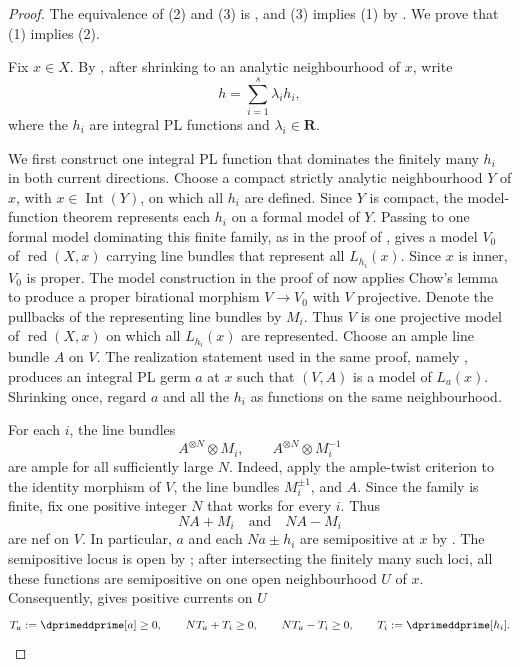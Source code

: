 \begin{proof}
The equivalence of (2) and (3) is
\cite[Proposition~7.1]{GJR26}, and (3) implies (1) by
\cite[Theorem~7.14]{GJR26}.  We prove that (1) implies (2).

Fix $x\in X$.  By \cite[Proposition~5.8 and Lemma~5.10]{GJR26}, after
shrinking to an analytic neighbourhood of $x$, write
\begin{equation}
\label{eq:p01-real-pl-decomposition}
                         h=\sum_{i=1}^{s}\lambda_i h_i,
\end{equation}
where the $h_i$ are integral PL functions and
$\lambda_i\in\mathbf R$.

We first construct one integral PL function that dominates the finitely
many $h_i$ in both current directions.  Choose a compact strictly analytic
neighbourhood $Y$ of $x$, with $x\in\operatorname{Int}(Y)$, on which all
$h_i$ are defined.  Since $Y$ is compact, the model-function theorem
\cite[\S5.6]{GJR26} represents each $h_i$ on a formal model of $Y$.
Passing to one formal model dominating this finite family, as in the proof
of \cite[Corollary~5.9]{GJR26}, gives a model $V_0$ of
$\operatorname{red}(X,x)$ carrying line bundles that represent all
$L_{h_i}(x)$.  Since $x$ is inner, $V_0$ is proper.  The model construction
in the proof of \cite[Proposition~7.10]{GJR26} now applies Chow's lemma to
produce a proper birational morphism $V\to V_0$ with $V$ projective.  Denote
the pullbacks of the representing line bundles by $M_i$.  Thus $V$ is one
projective model of $\operatorname{red}(X,x)$ on which all $L_{h_i}(x)$ are
represented.  Choose an ample line bundle $A$ on $V$.
The realization statement used in the same proof, namely
\cite[\S6.6.5]{CLD12}, produces an integral PL germ $a$ at $x$ such that
$(V,A)$ is a model of $L_a(x)$.  Shrinking once, regard $a$ and all the
$h_i$ as functions on the same neighbourhood.

For each $i$, the line bundles
\[
                         A^{\otimes N}\otimes M_i,
             \qquad     A^{\otimes N}\otimes M_i^{-1}
\]
are ample for all sufficiently large $N$.  Indeed, apply the ample-twist
criterion \cite[Tag~0892]{stacks-project} to the identity morphism of $V$,
the line bundles $M_i^{\pm1}$, and $A$.  Since the family is finite, fix one
positive integer $N$ that works for every $i$.  Thus
\begin{equation}
\label{eq:p01-ample-domination-residues}
                       NA+M_i\quad\text{and}\quad NA-M_i
\end{equation}
are nef on $V$.  In particular, $a$ and each $Na\pm h_i$ are semipositive
at $x$ by \cite[Proposition~7.1]{GJR26}.  The semipositive locus is open by
\cite[Remark~7.3(4)]{GJR26}; after intersecting the finitely many such loci,
all these functions are semipositive on one open neighbourhood $U$ of $x$.
Consequently, \cite[Theorem~7.14]{GJR26} gives positive currents on $U$
\begin{equation}
\label{eq:p01-current-domination}
 T_a:=\dprimeddprime[a]\geq0,
 \qquad NT_a+T_i\geq0,
 \qquad NT_a-T_i\geq0,
 \qquad T_i:=\dprimeddprime[h_i].
\end{equation}


\end{proof}
